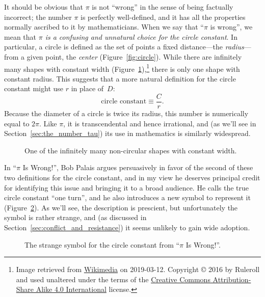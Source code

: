 It should be obvious that $\pi$ is not ``wrong'' in the sense of being factually incorrect; the number $\pi$ is perfectly well-defined, and it has all the properties normally ascribed to it by mathematicians. When we say that ``$\pi$ is wrong'', we mean that \emph{$\pi$ is a confusing and unnatural choice for the circle constant}. In particular, a circle is defined as the set of points a fixed distance---the \emph{radius}---from a given point, the \emph{center} (Figure~\ref{fig:circle}). While there are infinitely many shapes with constant width (Figure~\ref{fig:constant_width}),\footnote{Image retrieved from \href{https://commons.wikimedia.org/wiki/File:Reuleaux_triangle_roll.gif}{Wikimedia} on 2019-03-12. Copyright © 2016 by Ruleroll and used unaltered under the terms of the \href{https://creativecommons.org/licenses/by-sa/4.0/deed.en}{Creative Commons Attribution-Share Alike 4.0 International} license.} there is only one shape with constant radius. This suggests that a more natural definition for the circle constant might use $r$ in place of~$D$:
\begin{equation}
\label{eq:circle_constant}
\mbox{circle constant} \equiv \frac{C}{r}.
\end{equation}
Because the diameter of a circle is twice its radius, this number is numerically equal to $2\pi$. Like $\pi$, it is transcendental and hence irrational, and (as we'll see in Section~\ref{sec:the_number_tau}) its use in mathematics is similarly widespread.

\begin{figure}
\caption{One of the infinitely many non-circular shapes with constant width.\label{fig:constant_width}}
\end{figure}

In ``$\pi$ Is Wrong!'', Bob Palais argues persuasively in favor of the second of these two definitions for the circle constant, and in my view he deserves principal credit for identifying this issue and bringing it to a broad audience. He calls the true circle constant ``one turn'', and he also introduces a new symbol to represent it (Figure~\ref{fig:palais_tau}). As we'll see, the description is prescient, but unfortunately the symbol is rather strange, and (as discussed in Section~\ref{sec:conflict_and_resistance}) it seems unlikely to gain wide adoption.

\begin{figure}
\caption{The strange symbol for the circle constant from ``$\pi$ Is Wrong!''.\label{fig:palais_tau}}
\end{figure}


